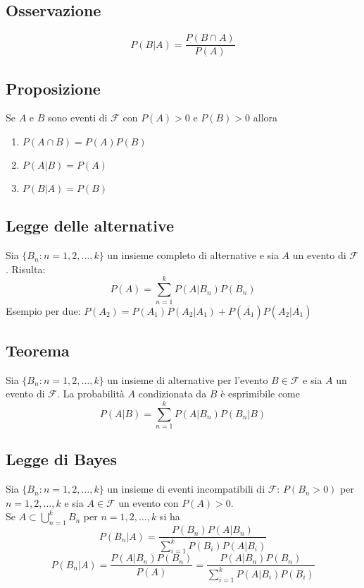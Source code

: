 \subsection*{Osservazione}
$$
P(B|A) = \frac{P(B \cap A)}{P(A)}
$$

\subsection*{Proposizione}
Se $A$ e $B$ sono eventi di $\mathscr{F}$ con $P(A) > 0$ e $P(B) > 0$ allora
\begin{enumerate}
    \item $P(A \cap B) = P(A)P(B)$
    \item $P(A|B) = P(A)$
    \item $P(B|A) = P(B)$
\end{enumerate}

\subsection*{Legge delle alternative}
Sia $\{B_n : n = 1,2,\dots,k\}$ un insieme completo di alternative e sia $A$ 
un evento di $\mathscr{F}$. Risulta:
$$
P(A) = \sum_{n=1}^{k}P(A|B_n)P(B_n)
$$
Esempio per due: $P(A_2) = P(A_1)P(A_2 | A_1) + P(\overline{A_1})P(A_2 | \overline{A_1})$

\subsection*{Teorema}
Sia $\{B_n : n = 1,2,\dots,k\}$ un insieme di alternative per l'evento $B \in \mathscr{F}$ e
sia $A$ un evento di $\mathscr{F}$. La probabilità $A$ condizionata da $B$ è esprimibile come
$$
P(A|B) = \sum_{n=1}^{k}P(A | B_n)P(B_n|B)
$$

\subsection*{Legge di Bayes}
Sia $\{B_n : n = 1,2,\dots,k\}$ un insieme di eventi incompatibili di $\mathscr{F}$: 
$P(B_n > 0)$ per $n = 1,2,\dots,k$ e sia $A \in \mathscr{F}$ un evento con $P(A) > 0$.\\
Se $\displaystyle A \subset \bigcup_{n=1}^{k} B_n$ per $n = 1,2,\dots,k$ si ha
$$
P(B_n|A) = \frac{P(B_n)P(A|B_n)}{\displaystyle \sum_{i=1}^{k}P(B_i)P(A|B_i)}
$$
$$
P(B_n|A) = \frac{P(A|B_n)P(B_n)}{P(A)} = \frac{P(A|B_n)P(B_n)}{\displaystyle 
\sum_{i=1}^{k}P(A|B_i)P(B_i)}
$$
